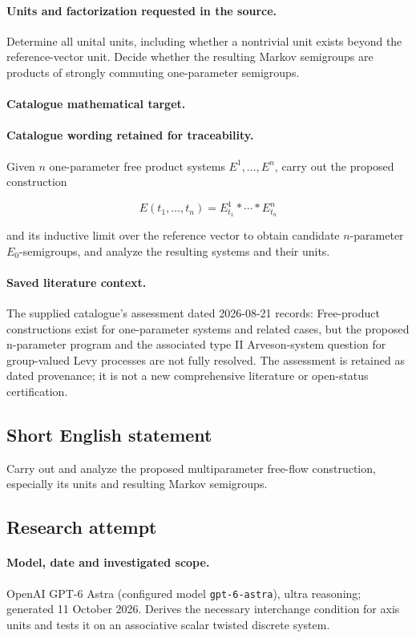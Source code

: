 \documentclass[11pt]{article}
\begin{document}
\paragraph{Units and factorization requested in the source.} Determine all unital units, including whether a nontrivial unit exists beyond the reference-vector unit. Decide whether the resulting Markov semigroups are products of strongly commuting one-parameter semigroups.

\paragraph{Catalogue mathematical target.}
\paragraph{Catalogue wording retained for traceability.}
Given $n$ one-parameter free product systems $E^1,\ldots,E^n$, carry out the proposed construction

$$E(t_1,\ldots,t_n)=E^1_{t_1}*\cdots*E^n_{t_n}$$

and its inductive limit over the reference vector to obtain candidate $n$-parameter $E_0$-semigroups, and analyze the resulting systems and their units.

\paragraph{Saved literature context.} The supplied catalogue's assessment dated 2026-08-21 records: Free-product constructions exist for one-parameter systems and related cases, but the proposed n-parameter program and the associated type II Arveson-system question for group-valued Levy processes are not fully resolved. The assessment is retained as dated provenance; it is not a new comprehensive literature or open-status certification.
\subsection{Short English statement}
Carry out and analyze the proposed multiparameter free-flow construction, especially its units and resulting Markov semigroups.
\subsection{Research attempt}
\paragraph{Model, date and investigated scope.}
OpenAI GPT-6 Astra (configured model \texttt{gpt-6-astra}), ultra reasoning; generated 11 October 2026. Derives the necessary interchange condition for axis units and tests it on an associative scalar twisted discrete system.
\end{document}
